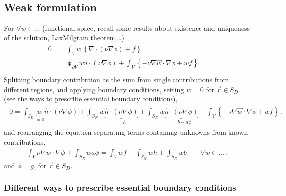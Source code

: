 \documentclass[letterpaper,10pt,english]{jupyterBook}
\begin{document}
\subsection{Weak formulation}
\label{\detokenize{ch/pde/elliptic:weak-formulation}}\label{\detokenize{ch/pde/elliptic:pde-elliptic-poisson-weak}}
\sphinxAtStartPar
For \(\forall w \in \dots\) (functional space, recall some results about existence and uniqueness of the solution, Lax\sphinxhyphen{}Milgram theorem,…)
\begin{equation*}
\begin{split}\begin{aligned}
  0
  &  = \int_V w \, \left\{ \nabla \cdot (\nu \nabla \phi) + f \right\} = \\
  &  = \oint_{\partial V} w \hat{n} \cdot (\nu \nabla \phi) + \int_V \left\{ - \nu \nabla \vec{w} \cdot \nabla \phi  + w f \right\} = \\
\end{aligned}\end{split}
\end{equation*}
\sphinxAtStartPar
Splitting boundary contribution as the sum from single contributions from different regions, and applying boundary conditions, setting \(w = 0\) for \(\vec{r} \in S_D\) (see the ways to prescribe essential boundary conditions),
\begin{equation*}
\begin{split}\begin{aligned}
  0 = \int_{S_D} \underbrace{w}_{= 0} \hat{n} \cdot (\nu \nabla \phi) + \int_{S_N} w \underbrace{\hat{n} \cdot (\nu \nabla \phi)}_{ = h} + \int_{S_R} w \underbrace{ \hat{n} \cdot (\nu \nabla \phi)}_{ = b - a \phi } + \int_V \left\{ - \nu \nabla \vec{w} \cdot \nabla \phi  + w f \right\} \ .
\end{aligned}\end{split}
\end{equation*}
\sphinxAtStartPar
and rearranging the equation separating terms containing unknowns from known contributions,
\begin{equation*}
\begin{split}\int_{V} \nu \nabla w \cdot \nabla \phi + \int_{S_R} w a \phi = \int_{V} w f + \int_{S_N} w h + \int_{S_R} w b \qquad \forall w \in \dots \ ,\end{split}
\end{equation*}
\sphinxAtStartPar
and \(\phi = g\), for \(\vec{r} \in S_D\).
\subsubsection*{Different ways to prescribe essential boundary conditions}
\end{document}
